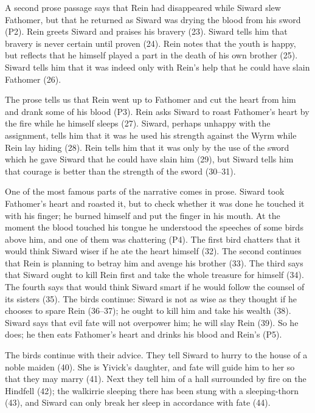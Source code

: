 A second prose passage says that Rein had disappeared while Siward slew Fathomer, but that he returned as Siward was drying the blood from his sword (P2).  Rein greets Siward and praises his bravery (23).  Siward tells him that bravery is never certain until proven (24).  Rein notes that the youth is happy, but reflects that he himself played a part in the death of his own brother (25).  Siward tells him that it was indeed only with Rein’s help that he could have slain Fathomer (26).

The prose tells us that Rein went up to Fathomer and cut the heart from him and drank some of his blood (P3).  Rein asks Siward to roast Fathomer’s heart by the fire while he himself sleeps (27).  Siward, perhaps unhappy with the assignment, tells him that it was he used his strength against the Wyrm while Rein lay hiding (28).  Rein tells him that it was only by the use of the sword which he gave Siward that he could have slain him (29), but Siward tells him that courage is better than the strength of the sword (30--31).

One of the most famous parts of the narrative comes in prose.  Siward took Fathomer’s heart and roasted it, but to check whether it was done he touched it with his finger; he burned himself and put the finger in his mouth.  At the moment the blood touched his tongue he understood the speeches of some birds above him, and one of them was chattering (P4).
The first bird chatters that it would think Siward wiser if he ate the heart himself (32).  The second continues that Rein is planning to betray him and avenge his brother (33).  The third says that Siward ought to kill Rein first and take the whole treasure for himself (34).  The fourth says that would think Siward smart if he would follow the counsel of its sisters (35).  The birds continue: Siward is not as wise as they thought if he chooses to spare Rein (36--37); he ought to kill him and take his wealth (38).  Siward says that evil fate will not overpower him; he will slay Rein (39).  So he does; he then eats Fathomer’s heart and drinks his blood and Rein’s (P5).

The birds continue with their advice.  They tell Siward to hurry to the house of a noble maiden (40).  She is Yivick’s daughter, and fate will guide him to her so that they may marry (41).  Next they tell him of a hall surrounded by fire on the Hindfell (42); the walkirrie sleeping there has been stung with a sleeping-thorn (43), and Siward can only break her sleep in accordance with fate (44).


